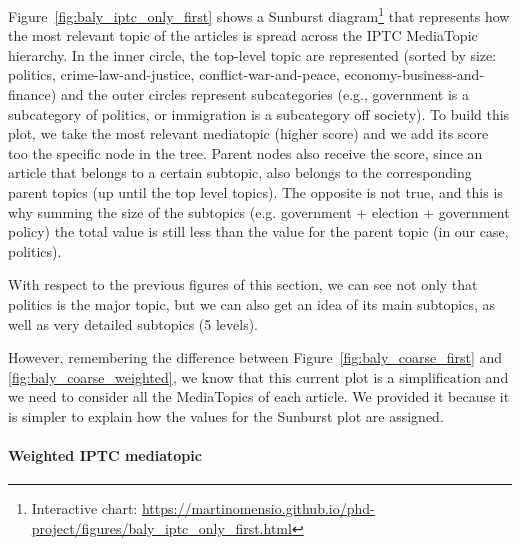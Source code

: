 Figure~\ref{fig:baly_iptc_only_first} shows a Sunburst diagram\footnote{Interactive chart: \url{https://martinomensio.github.io/phd-project/figures/baly_iptc_only_first.html}} that represents how the most relevant topic of the articles is spread across the IPTC MediaTopic hierarchy.
In the inner circle, the top-level topic are represented (sorted by size: politics, crime-law-and-justice, conflict-war-and-peace, economy-business-and-finance) and the outer circles represent subcategories (e.g., government is a subcategory of politics, or immigration is a subcategory off society).
To build this plot, we take the most relevant mediatopic (higher score) and we add its score too the specific node in the tree. Parent nodes also receive the score, since an article that belongs to a certain subtopic, also belongs to the corresponding parent topics (up until the top level topics). The opposite is not true, and this is why summing the size of the subtopics (e.g. government + election + government policy) the total value is still less than the value for the parent topic (in our case, politics).

With respect to the previous figures of this section, we can see not only that politics is the major topic, but we can also get an idea of its main subtopics, as well as very detailed subtopics (5 levels).

However, remembering the difference between Figure~\ref{fig:baly_coarse_first} and \ref{fig:baly_coarse_weighted}, we know that this current plot is a simplification and we need to consider all the MediaTopics of each article.
We provided it because it is simpler to explain how the values for the Sunburst plot are assigned.




\paragraph{Weighted IPTC mediatopic}

